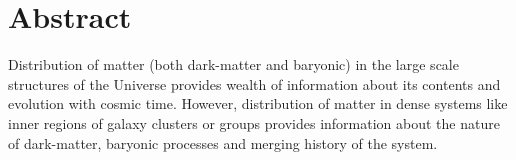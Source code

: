 {}


\chapter*{Abstract}

Distribution of matter (both dark-matter and baryonic) in the large scale structures
of the Universe provides wealth of information about its contents and evolution
with cosmic time. However, distribution of matter in dense systems like inner regions
of galaxy clusters or groups provides information about the nature of dark-matter,
baryonic processes and merging history of the system. 

